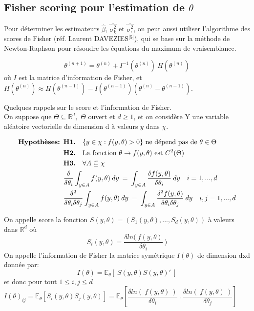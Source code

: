 \documentclass[11pt,fleqn]{book} %
\begin{document}
\vspace{4em}

\subsection{Fisher scoring pour l'estimation de $\theta$}

\vspace{1em}

Pour déterminer les estimateurs $\hat{\beta}$, $\hat{\sigma_k^2}$ et $\hat{\sigma_{\epsilon}^2}$, on peut aussi utiliser l'algorithme des scores de Fisher (réf. Laurent DAVEZIES$^\textbf{[5]}$), qui se base sur la méthode de Newton-Raphson pour résoudre les équations du maximum de vraisemblance. 

\[
\theta^{(n+1)} = \theta^{(n)} + I^{-1}(\theta^{(n)}) \:H(\theta^{(n)}) 
\]
où $I$ est la matrice d'information de Fisher, et  $H(\theta^{(n)})\approx H(\theta^{(n-1)})-I(\theta^{(n-1)})(\theta^{(n)}-\theta^{(n-1)}).$ 

\vspace{1em}

Quelques rappels sur le score et l'information de Fisher.\\

On suppose que $\Theta\subseteq \mathbb{R}^d,$ $\Theta$ ouvert et $d\geq 1$, et on considère Y une variable aléatoire vectorielle de dimension d à valeurs $y$ dans $\chi$.

\vspace{0.5em}

\begin{align*}
\textbf{Hypothèses: } &\textbf{H1.} \quad \{ y\in\chi : f(y,\theta)>0\} \textnormal{ ne dépend pas de } \theta\in\Theta\\
&\textbf{H2.} \quad \textnormal{La fonction } \theta\rightarrow f(y,\theta) \textnormal{ est } C^2(\Theta)\\
&\textbf{H3.} \quad \forall A \subseteq \chi\\ 
& \frac{\delta}{\delta\theta_i} \int_{y\in A} f(y,\theta)\: dy \:=\: \int_{y\in A} \frac{\delta f(y,\theta)}{\delta\theta_i} \:dy  \quad i=1,...,d\\
& \frac{\delta^2}{\delta\theta_i\delta\theta_j} \int_{y\in A} f(y,\theta)\: dy \:=\: \int_{y\in A} \frac{\delta^2  f(y,\theta)}{\delta\theta_i\delta\theta_j}\: dy \quad i,j=1,...,d
\end{align*}
 
\newpage 

\begin{definition}
On appelle score la fonction $S(y,\theta)=\left( S_1(y,\theta), ..., S_d(y,\theta) \right)$ à valeurs dans $\mathbb{R}^d$ où
\[
S_i(y,\theta)=\frac{\delta ln(\:f(y,\theta)}{\delta \theta_i} \:)
\]
On appelle l'information de Fisher la matrice symétrique $I(\theta)$ de dimension d\:x\:d donnée par: 
\[
I(\theta)=\mathbb{E}_\theta\left[\: S(y,\theta) S(y,\theta)'  \:\right]
\]
et donc pour tout $ 1 \leq i,j \leq d$
\[
I(\theta)_{ij}=\mathbb{E}_\theta\left[ S_i(y,\theta) S_j(y,\theta)\right]=\mathbb{E}_\theta\left[  \frac{\delta ln(\:f(y,\theta)\:)}{\delta \theta_i} \:.\:  \frac{\delta ln(\:f(y,\theta)\:)}{\delta \theta_j} \right] \qquad 
\] 
\end{definition}
\end{document}
